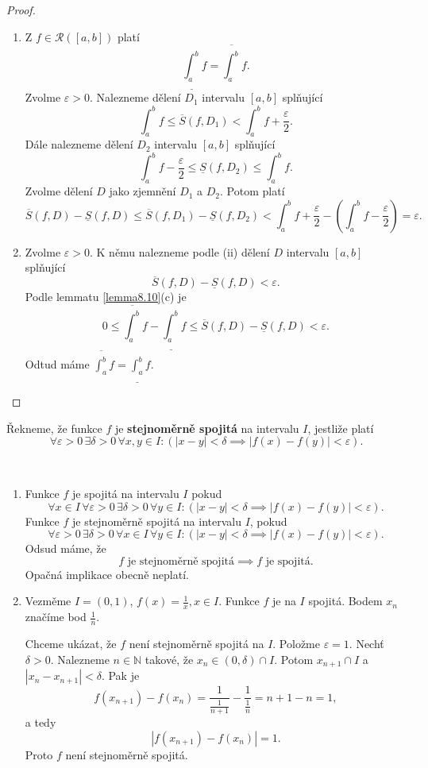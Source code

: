 \begin{proof}
	\,
	\begin{enumerate}
		\item[$\implies$] Z $f \in \mathcal R(\left [ a,b \right ] )$ platí
		$$
		    \underline{\int_a^b} f = \overline{\int_a^b} f.
		$$
		Zvolme $\varepsilon > 0$. Nalezneme dělení $D_1$ intervalu $[a,b]$ splňující
		$$
		    \int_a^b f \leq \overline{S}(f,D_1)< \int_a^b f + \frac{\varepsilon}{2}.
		$$
		Dále nalezneme dělení $D_2$ intervalu $[a,b]$ splňující
		$$
		    \int_a^b f - \frac{\varepsilon}{2}\leq\underline{S}(f,D_2) \leq \int_a^b f.
		$$
		Zvolme dělení $D$ jako zjemnění $D_1$ a $D_2$. Potom platí
		$$
		    \overline{S}(f,D)-\underline{S}(f,D) \leq \overline{S}(f,D_1) - \underline S(f,D_2) < \int_a^b f + \frac{\varepsilon}{2} - \left( \int_a^b f - \frac{\varepsilon}{2} \right )= \varepsilon.
		$$
		\item[$\impliedby$] Zvolme $\varepsilon>0$. K němu nalezneme podle (ii) dělení
		$D$ intervalu $[a,b]$ splňující
		$$
		    \overline S(f,D) - \underline S(f,D) < \varepsilon.
		$$
		Podle lemmatu \ref{lemma8.10}(c) je
		$$
		    0 \leq \overline{\int_a^b} f - \underline{\int_a^b} f \leq \overline S(f,D) - \underline S(f,D) < \varepsilon.
		$$
		Odtud máme $\overline{\int_a^b}f=\underline{\int_a^b}f$.\qedhere
	\end{enumerate}
\end{proof}

\begin{definice}
Řekneme, že funkce $f$ je \textbf{stejnoměrně spojitá} na intervalu $I$, jestliže platí
\[
\forall \varepsilon > 0\, \exists \delta > 0\, \forall x,y \in I: (|x-y| < \delta \implies |f(x)-f(y)| < \varepsilon).
\]
\end{definice}

\begin{poznamka}\,
\begin{enumerate}[(1)]
	\item Funkce $f$ je spojitá na intervalu $I$ pokud
	$$
	\forall x \in I \, \forall \varepsilon> 0 \, \exists \delta >0 \, \forall y \in I: \left( |x-y| < \delta \implies |f(x)-f(y)|<\varepsilon \right ).
	$$
	Funkce $f$ je stejnoměrně spojitá na intervalu $I$, pokud
	$$
	    \forall  \varepsilon > 0 \, \exists \delta > 0 \, \forall x \in I\, \forall y \in I: \left( |x-y| < \delta \implies |f(x)-f(y)|<\varepsilon \right ).
	$$
	Odsud máme, že
	$$
	    f \text{ je stejnoměrně spojitá} \implies f \text{ je spojitá}.
	$$
	Opačná implikace obecně neplatí.
	\item Vezměme $I=(0,1)$, $f(x)= \frac{1}{x}, x \in I$. Funkce $f$ je na $I$ spojitá. Bodem $x_n$ značíme
	bod $\frac{1}{n}$.
	\par Chceme ukázat, že $f$ není stejnoměrně spojitá na $I$. Položme $\varepsilon = 1$.
	Nechť $\delta >0$. Nalezneme $n\in \mathbb N $ takové, že $x_n \in (0,\delta) \cap I$. Potom
	$x_{n+1}\cap I$ a $|x_n - x_{n+1}|<\delta$. Pak je
	$$
	    f(x_{n+1})-f(x_n) = \frac{1}{\frac{1}{n+1}} - \frac{1}{\frac{1}{n}} = n+1-n = 1,
	$$
	a tedy
	$$
	    |f(x_{n+1})-f(x_n)| = 1.
	$$
	Proto $f$ není stejnoměrně spojitá.
\end{enumerate}
\end{poznamka}

